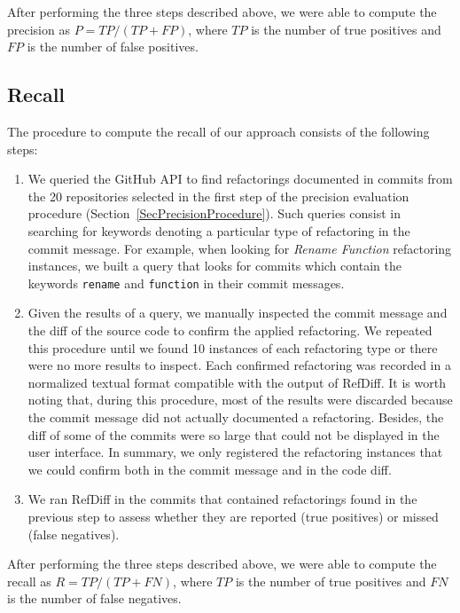 After performing the three steps described above, we were able to compute the precision as $P = \mathit{TP} / (\mathit{TP} + \mathit{FP})$, where $\mathit{TP}$ is the number of true positives and $\mathit{FP}$ is the number of false positives.



\subsection{Recall}

The procedure to compute the recall of our approach consists of the following steps:

\begin{enumerate}  
\item We queried the GitHub API to find refactorings documented in commits from the 20 repositories selected in the first step of the precision evaluation procedure (Section~\ref{SecPrecisionProcedure}). Such queries consist in searching for keywords denoting a particular type of refactoring in the commit message. For example, when looking for \emph{Rename Function} refactoring instances, we built a query that looks for commits which contain the keywords \texttt{rename} and \texttt{function} in their commit messages.

\item Given the results of a query, we manually inspected the commit message and the diff of the source code to confirm the applied refactoring. We repeated this procedure until we found 10 instances of each refactoring type or there were no more results to inspect. Each confirmed refactoring was recorded in a normalized textual format compatible with the output of RefDiff. It is worth noting that, during this procedure, most of the results were discarded because the commit message did not actually documented a refactoring. Besides, the diff of some of the commits were so large that could not be displayed in the user interface. In summary, we only registered the refactoring instances that we could confirm both in the commit message and in the code diff.

\item We ran RefDiff in the commits that contained refactorings found in the previous step to assess whether they are reported (true positives) or missed (false negatives). 

\end{enumerate}

After performing the three steps described above, we were able to compute the recall as $R = \mathit{TP} / (\mathit{TP} + \mathit{FN})$, where $\mathit{TP}$ is the number of true positives and $\mathit{FN}$ is the number of false negatives.


